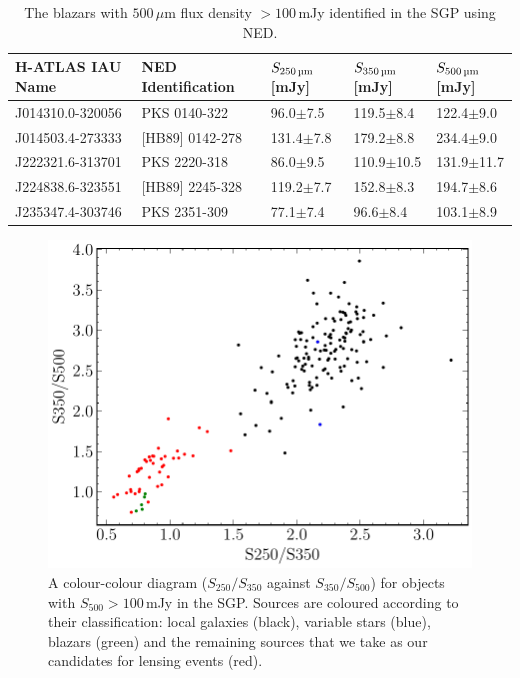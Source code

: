 \begin{table}
    \centering
    \begin{tabular}{p{3.75cm}|p{3.25cm}|p{2cm}|p{2cm}|p{2cm}}
        \hline
        \hline
        H-ATLAS IAU Name & NED Identification & $S_{\textrm{250\,\micron}}$ [mJy] & $S_{\textrm{350\,\micron}}$ [mJy] & $S_{\textrm{500\,\micron}}$ [mJy] \\
        \hline
        \hline
        J014310.0-320056 & PKS 0140-322 & 96.0$\pm$7.5 & 119.5$\pm$8.4 & 122.4$\pm$9.0 \\
        J014503.4-273333 & [HB89] 0142-278 & 131.4$\pm$7.8 & 179.2$\pm$8.8 & 234.4$\pm$9.0 \\
        J222321.6-313701 & PKS 2220-318 & 86.0$\pm$9.5 & 110.9$\pm$10.5 & 131.9$\pm$11.7 \\
        J224838.6-323551 & [HB89] 2245-328 & 119.2$\pm$7.7 & 152.8$\pm$8.3 & 194.7$\pm$8.6 \\
        J235347.4-303746 & PKS 2351-309 & 77.1$\pm$7.4 & 96.6$\pm$8.4 & 103.1$\pm$8.9 \\
        \hline
    \end{tabular}
    \caption[Blazars in the SGP with $S_{500} > 100\,$mJy]{The blazars with $500\,\mu$m flux density $> 100\,$mJy identified in the SGP using NED.}
    \label{tab:blazars}
\end{table}

\begin{figure}
    \centering
    \includegraphics[width=0.79\columnwidth]{Figures/Figure_2_9.pdf}
    \caption[$S_{250}/S_{350}$ against $S_{350}/S_{500}$ diagram of SGP sources with $S_{500} > 100\,$mJy]{A colour-colour diagram ($S_{250}/S_{350}$ against $S_{350}/S_{500}$) for objects with $S_{500} > 100\,$mJy in the SGP. Sources are coloured according to their classification: local galaxies (black), variable stars (blue), blazars (green) and the remaining sources that we take as our candidates for lensing events (red).}
    \label{fig:submm_colours_lensed_candidates}
\end{figure}

